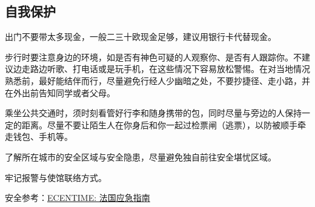 \subsection{自我保护}

出门不要带太多现金，一般二三十欧现金足够，建议用银行卡代替现金。

步行时要注意身边的环境，如是否有神色可疑的人观察你、是否有人跟踪你。不建议边走路边听歌、打电话或是玩手机，在这些情况下容易放松警惕。在对当地情况熟悉前，最好能结伴而行，尽量避免行经人少幽暗之处，不要抄捷径、走小路，并在外出前告知同学或者父母。

乘坐公共交通时，须时刻看管好行李和随身携带的包，同时尽量与旁边的人保持一定的距离。尽量不要让陌生人在你身后和你一起过检票闸（逃票），以防被顺手牵走钱包、手机等。

了解所在城市的安全区域与安全隐患，尽量避免独自前往安全堪忧区域。

牢记报警与使馆联络方式。

安全参考：\href{https://www.ecentime.com/article/GuideUrgenceFrance}{ECENTIME: 法国应急指南}
